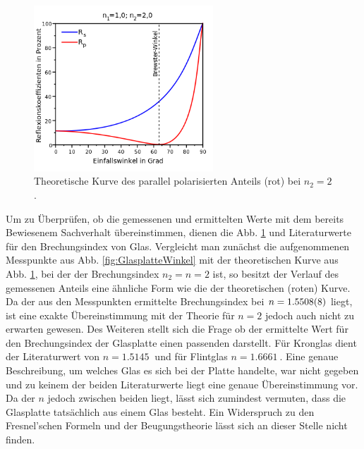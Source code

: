 		\begin{figure}[ht]
			\centering
			\includegraphics[width=0.6\textwidth]{bilder/wikiBrewster.png}
			\caption{Theoretische Kurve des parallel polarisierten Anteils (rot) bei $n_2 = 2$. \cite{wikiBrewster}}
			\label{fig:wiki_brewster}	
		\end{figure}
		Um zu Überprüfen, ob die gemessenen und ermittelten Werte mit dem bereits Bewiesenem Sachverhalt übereinstimmen, dienen die Abb. \ref{fig:wiki_brewster} und Literaturwerte für den Brechungsindex von Glas.
		Vergleicht man zunächst die aufgenommenen Messpunkte aus Abb. \ref{fig:GlasplatteWinkel} mit der theoretischen Kurve aus Abb. \ref{fig:wiki_brewster}, bei der der Brechungsindex $n_2 = n = 2$ ist, so besitzt der Verlauf des gemessenen Anteils eine ähnliche Form wie die der theoretischen (roten) Kurve.
		Da der aus den Messpunkten ermittelte Brechungsindex bei $n = \SI{1,5508+-0,0008}{}$ liegt, ist eine exakte Übereinstimmung mit der Theorie für $n=2$ jedoch auch nicht zu erwarten gewesen.
		Des Weiteren stellt sich die Frage ob der ermittelte Wert für den Brechungsindex der Glasplatte  einen passenden darstellt.
		Für Kronglas dient der Literaturwert\cite{Refrac} von $n = \SI{1.5145}{}$ und für Flintglas $n = \SI{1.6661}{}$.
		Eine genaue Beschreibung, um welches Glas es sich bei der Platte handelte, war nicht gegeben und zu keinem der beiden Literaturwerte liegt eine genaue Übereinstimmung vor.
		Da der $n$ jedoch zwischen beiden liegt, lässt sich zumindest vermuten, dass die Glasplatte tatsächlich aus einem Glas besteht.
		Ein Widerspruch zu den Fresnel'schen Formeln und der Beugungstheorie lässt sich an dieser Stelle nicht finden.
		
		